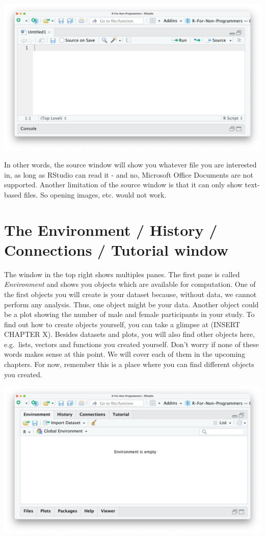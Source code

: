 \documentclass[
]{book}
\begin{document}
\includegraphics{images/chapter_04_img/03_source_window/01_rstudio_source.png}

In other words, the source window will show you whatever file you are interested in, as long as RStudio can read it - and no, Microsoft Office Documents are not supported. Another limitation of the source window is that it can only show text-based files. So opening images, etc. would not work.

\hypertarget{the-environment-history-connections-tutorial-window}{%
\section{The Environment / History / Connections / Tutorial window}\label{the-environment-history-connections-tutorial-window}}

The window in the top right shows multiples panes. The first pane is called \emph{Environment} and shows you objects which are available for computation. One of the first objects you will create is your dataset because, without data, we cannot perform any analysis. Thus, one object might be your data. Another object could be a plot showing the number of male and female participants in your study. To find out how to create objects yourself, you can take a glimpse at (INSERT CHAPTER X). Besides datasets and plots, you will also find other objects here, e.g.~lists, vectors and functions you created yourself. Don't worry if none of these words makes sense at this point. We will cover each of them in the upcoming chapters. For now, remember this is a place where you can find different objects you created.

\includegraphics{images/chapter_04_img/04_environment_history_etc/01_rstudio_environment.png}
\end{document}
